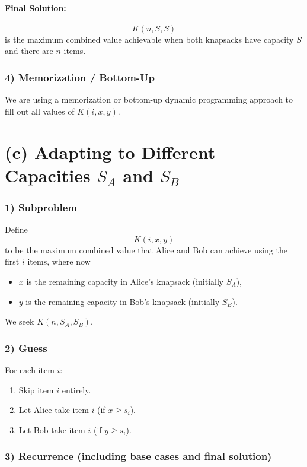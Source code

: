 \documentclass[11pt]{article}
\begin{document}
    \paragraph{Final Solution:}
    \[
    K(n, S, S)
    \]
    is the maximum combined value achievable when both knapsacks have capacity \(S\) and there are \(n\) items.
    
    \subsubsection*{4) Memorization / Bottom-Up}
    We are using a memorization or bottom-up dynamic programming approach to fill out all values of \(K(i,x,y)\).
    
    \bigskip
    
    \section*{(c) Adapting to Different Capacities \(S_A\) and \(S_B\)}
    
    \subsubsection*{1) Subproblem}
    Define
    \[
    K(i, x, y)
    \]
    to be the maximum combined value that Alice and Bob can achieve using the first \(i\) items, where now
    \begin{itemize}
        \item \(x\) is the remaining capacity in Alice's knapsack (initially \(S_A\)),
        \item \(y\) is the remaining capacity in Bob's knapsack (initially \(S_B\)).
    \end{itemize}
    We seek \(K(n, S_A, S_B)\).
    
    \subsubsection*{2) Guess}
    For each item \(i\):
    \begin{enumerate}
        \item Skip item \(i\) entirely.
        \item Let Alice take item \(i\) (if \(x \ge s_i\)).
        \item Let Bob take item \(i\) (if \(y \ge s_i\)).
    \end{enumerate}
    
    \subsubsection*{3) Recurrence (including base cases and final solution)}
\end{document}
